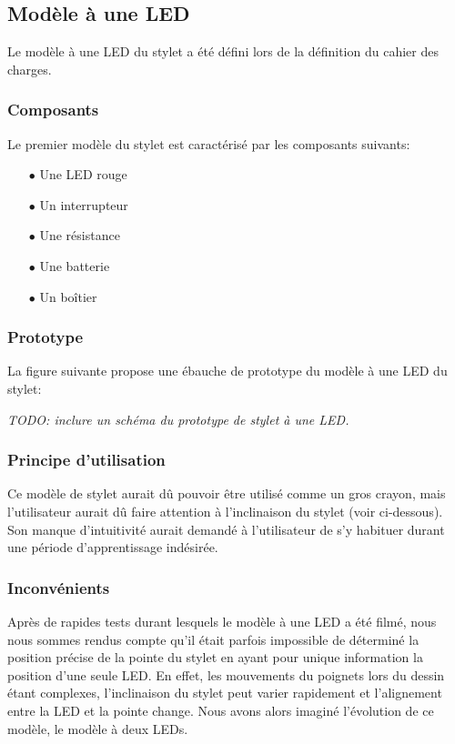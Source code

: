 \documentclass[11pt,a4paper,oldfontcommands]{memoir}
\begin{document}
\subsection{Modèle à une LED}

Le modèle à une LED du stylet a été défini lors de la définition du cahier des charges.

\subsubsection{Composants}

Le premier modèle du stylet est caractérisé par les composants suivants:

\begin{itemize}
\item[$\bullet$] Une LED rouge
\item[$\bullet$] Un interrupteur
\item[$\bullet$] Une résistance
\item[$\bullet$] Une batterie
\item[$\bullet$] Un boîtier
\end{itemize}

\subsubsection{Prototype}

La figure suivante propose une ébauche de prototype du modèle à une LED du stylet:

\textit{TODO: inclure un schéma du prototype de stylet à une LED.}

\subsubsection{Principe d'utilisation}

Ce modèle de stylet aurait dû pouvoir être utilisé comme un gros crayon, mais l'utilisateur aurait dû faire attention à l'inclinaison du stylet (voir ci-dessous). Son manque d'intuitivité aurait demandé à l'utilisateur de s'y habituer durant une période d'apprentissage indésirée.

\subsubsection{Inconvénients}

Après de rapides tests durant lesquels le modèle à une LED a été filmé, nous nous sommes rendus compte qu'il était parfois impossible de déterminé la position précise de la pointe du stylet en ayant pour unique information la position d'une seule LED. En effet, les mouvements du poignets lors du dessin étant complexes, l'inclinaison du stylet peut varier rapidement et l'alignement entre la LED et la pointe change.
Nous avons alors imaginé l'évolution de ce modèle, le modèle à deux LEDs.
\end{document}
